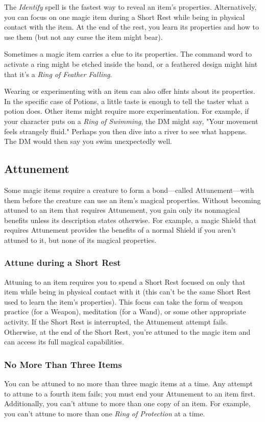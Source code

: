 \documentclass[10pt,a4paper,twoside,bg=print,twocolumn,openany,nodeprecatedcode]{dndbook}
\begin{document}
The \textit{Identify} spell is the fastest way to reveal an item's properties. Alternatively, you can focus on one magic item during a Short Rest while being in physical contact with the item. At the end of the rest, you learn its properties and how to use them (but not any curse the item might bear).

Sometimes a magic item carries a clue to its properties. The command word to activate a ring might be etched inside the band, or a feathered design might hint that it's a \textit{Ring of Feather Falling}.

Wearing or experimenting with an item can also offer hints about its properties. In the specific case of Potions, a little taste is enough to tell the taster what a potion does. Other items might require more experimentation. For example, if your character puts on a \textit{Ring of Swimming}, the DM might say, "Your movement feels strangely fluid." Perhaps you then dive into a river to see what happens. The DM would then say you swim unexpectedly well.

\subsection{Attunement}
Some magic items require a creature to form a bond—called Attunement—with them before the creature can use an item's magical properties. Without becoming attuned to an item that requires Attunement, you gain only its nonmagical benefits unless its description states otherwise. For example, a magic Shield that requires Attunement provides the benefits of a normal Shield if you aren't attuned to it, but none of its magical properties.

\subsubsection{Attune during a Short Rest}
Attuning to an item requires you to spend a Short Rest focused on only that item while being in physical contact with it (this can't be the same Short Rest used to learn the item's properties). This focus can take the form of weapon practice (for a Weapon), meditation (for a Wand), or some other appropriate activity. If the Short Rest is interrupted, the Attunement attempt fails. Otherwise, at the end of the Short Rest, you're attuned to the magic item and can access its full magical capabilities.

\subsubsection{No More Than Three Items}
You can be attuned to no more than three magic items at a time. Any attempt to attune to a fourth item fails; you must end your Attunement to an item first. Additionally, you can't attune to more than one copy of an item. For example, you can't attune to more than one \textit{Ring of Protection} at a time.
\end{document}
